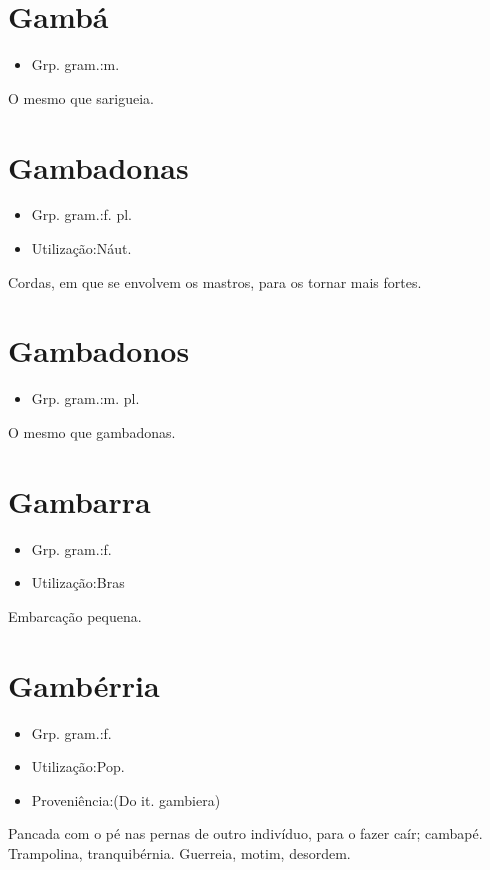 \section{Gambá}
\begin{itemize}
\item {Grp. gram.:m.}
\end{itemize}
O mesmo que \textunderscore sarigueia\textunderscore .
\section{Gambadonas}
\begin{itemize}
\item {Grp. gram.:f. pl.}
\end{itemize}
\begin{itemize}
\item {Utilização:Náut.}
\end{itemize}
Cordas, em que se envolvem os mastros, para os tornar mais fortes.
\section{Gambadonos}
\begin{itemize}
\item {Grp. gram.:m. pl.}
\end{itemize}
O mesmo que \textunderscore gambadonas\textunderscore .
\section{Gambarra}
\begin{itemize}
\item {Grp. gram.:f.}
\end{itemize}
\begin{itemize}
\item {Utilização:Bras}
\end{itemize}
Embarcação pequena.
\section{Gambérria}
\begin{itemize}
\item {Grp. gram.:f.}
\end{itemize}
\begin{itemize}
\item {Utilização:Pop.}
\end{itemize}
\begin{itemize}
\item {Proveniência:(Do it. \textunderscore gambiera\textunderscore )}
\end{itemize}
Pancada com o pé nas pernas de outro indivíduo, para o fazer caír; cambapé.
Trampolina, tranquibérnia.
Guerreia, motim, desordem.
